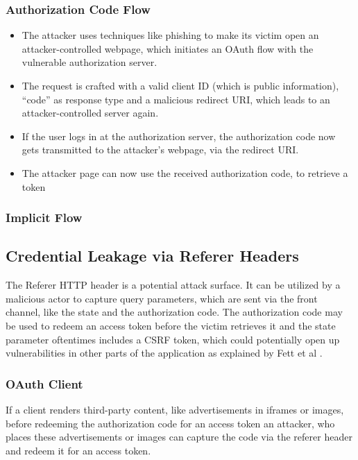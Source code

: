 \documentclass[
    fontsize=12pt,
    headings=small,
    parskip=half,           %
    bibliography=totoc,
    numbers=noenddot,       %
    open=any,               %
    ]{scrreprt}
\begin{document}
\subsubsection{Authorization Code Flow}
\begin{itemize}
	\item The attacker uses techniques like phishing to make its victim open an attacker-controlled webpage, which initiates an OAuth flow with the vulnerable authorization server.
	\item The request is crafted with a valid client ID (which is public information), ``code'' as response type and a malicious redirect URI, which leads to an attacker-controlled server again.
	\item If the user logs in at the authorization server, the authorization code now gets transmitted to the attacker's webpage, via the redirect URI.
	\item The attacker page can now use the received authorization code, to retrieve a token 
\end{itemize}

\subsubsection{Implicit Flow}


\subsection{Credential Leakage via Referer Headers}
The Referer HTTP header is a potential attack surface. It can be utilized by a malicious actor to capture query parameters, which are sent via the front channel, like the state and the authorization code. The authorization code may be used to redeem an access token before the victim retrieves it and the state parameter oftentimes includes a CSRF token, which could potentially open up vulnerabilities in other parts of the application as explained by Fett et al \cite{fett2016comprehensive}.

\subsubsection{OAuth Client}
If a client renders third-party content, like advertisements in iframes or images, before redeeming the authorization code for an access token an attacker, who places these advertisements or images can capture the code via the referer header and redeem it for an access token.
\end{document}
